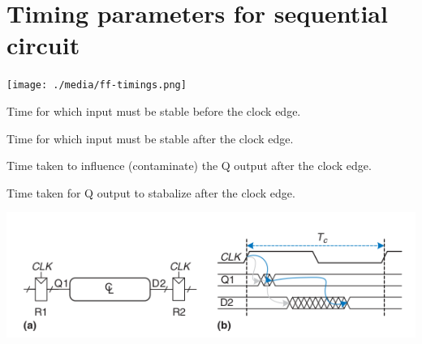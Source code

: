 % 
% 

\section{Timing parameters for sequential circuit~\cite[Section~3.5]{harris2022digital}}

\texttt{[image: ./media/ff-timings.png]}\\
\begin{definition}
  Time for which input must be stable before the clock edge.
\end{definition}

\begin{definition}
  Time for which input must be stable after the clock edge.
\end{definition}

\begin{definition}
  Time taken to influence (contaminate) the Q output after the clock edge.
\end{definition}

\begin{definition}
  Time taken for Q output to stabalize  after the clock edge.
\end{definition}
\includegraphics[width=0.8\linewidth]{./media/fig3.38.png}

